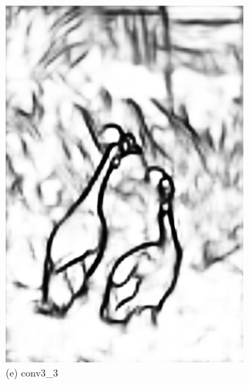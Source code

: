 \documentclass[CJK,aspectratio=169]{beamer}  %
\begin{document}
\begin{frame}
\begin{figure}
\begin{minipage}{0.11\columnwidth}
				\includegraphics[width=\linewidth]{picture/LLIE/RCF/conv3_3}
				\caption*{\tiny (e) conv3\_3}
				\label{fig: conv3_3}
			\end{minipage}
			\begin{minipage}{0.11\columnwidth}

\end{minipage}
\end{figure}
\end{frame}
\end{document}
